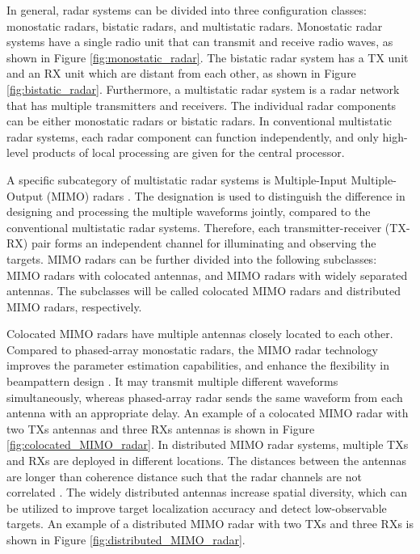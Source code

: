 \documentclass[english, 12pt, a4paper, elec, utf8, a-1b, online]{aaltothesis}
\begin{document}
In general, radar systems can be divided into three configuration classes: monostatic radars, bistatic radars, and multistatic radars.
Monostatic radar systems have a single radio unit that can transmit and receive radio waves, as shown in Figure \ref{fig:monostatic_radar}.
The bistatic radar system has a TX unit and an RX unit which are distant from each other, as shown in Figure \ref{fig:bistatic_radar}.
Furthermore, a multistatic radar system is a radar network that has multiple transmitters and receivers.
The individual radar components can be either monostatic radars or bistatic radars.
In conventional multistatic radar systems, each radar component can function independently, and only high-level products of local processing are given for the central processor.

A specific subcategory of multistatic radar systems is Multiple-Input Multiple-Output (MIMO) radars \cite{Haimovich2008}.
The designation is used to distinguish the difference in designing and processing the multiple waveforms jointly, compared to the conventional multistatic radar systems.
Therefore, each transmitter-receiver (TX-RX) pair forms an independent
channel for illuminating and observing the targets.
MIMO radars can be further divided into the following subclasses: MIMO radars with colocated antennas, and MIMO radars with widely separated antennas.
The subclasses will be called colocated MIMO radars and distributed MIMO radars, respectively.

Colocated MIMO radars have multiple antennas closely located to each other.
Compared to phased-array monostatic radars, the MIMO radar technology improves the parameter estimation capabilities, and enhance the flexibility in beampattern design \cite{Li2007}.
It may transmit multiple different waveforms simultaneously, whereas phased-array radar sends the same waveform from each antenna with an appropriate delay.
An example of a colocated MIMO radar with two TXs antennas and three RXs antennas is shown in Figure \ref{fig:colocated_MIMO_radar}.
In distributed MIMO radar systems, multiple TXs and RXs are deployed in different locations.
The distances between the antennas are longer than coherence distance such that the radar channels are not correlated \cite{Haimovich2008}.
The widely distributed antennas increase spatial diversity, which can be utilized to improve target localization accuracy and detect low-observable targets.
An example of a distributed MIMO radar with two TXs and three RXs is shown in Figure \ref{fig:distributed_MIMO_radar}.
\end{document}

